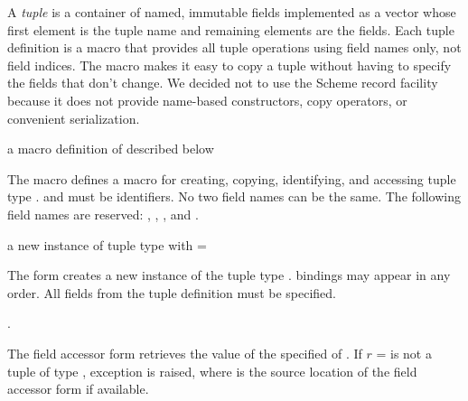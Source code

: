 A \emph{tuple} is a container of named, immutable fields
implemented as a vector whose first element is the tuple name and
remaining elements are the fields. Each tuple definition is a macro
that provides all tuple operations using field names only, not field
indices. The macro makes it easy to copy a tuple without having to
specify the fields that don't change.  We decided not to use the
Scheme record facility because it does not provide name-based
constructors, copy operators, or convenient serialization.

\begin{syntax}
\end{syntax}
\expandsto{} a macro definition of  described below

The  macro defines a macro for creating,
copying, identifying, and accessing tuple type . 
and  \etc{} must be identifiers. No two field names can be
the same. The following field names are reserved: ,
, , and .

\begin{syntax}
\end{syntax}
\returns{} a new instance of tuple type  with  =
 \etc{}

The  form creates a new instance of the tuple type
.  bindings may appear in any order. All fields
from the tuple definition must be specified.

\begin{syntax}
\end{syntax}
\returns{} .

The field accessor form retrieves the value of the specified
 of . If $r$ =  is not a tuple
of type , exception  is raised, where  is the source location of the
field accessor form if available.

